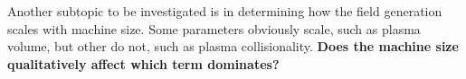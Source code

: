 \documentclass[a4paper]{article}
\begin{document}
Another subtopic to be investigated is in determining how the field generation scales with machine size.
Some parameters obviously scale, such as plasma volume, but other do not, such as plasma collisionality.
\textbf{Does the machine size qualitatively affect which term dominates?}




\printbibliography
\end{document}
